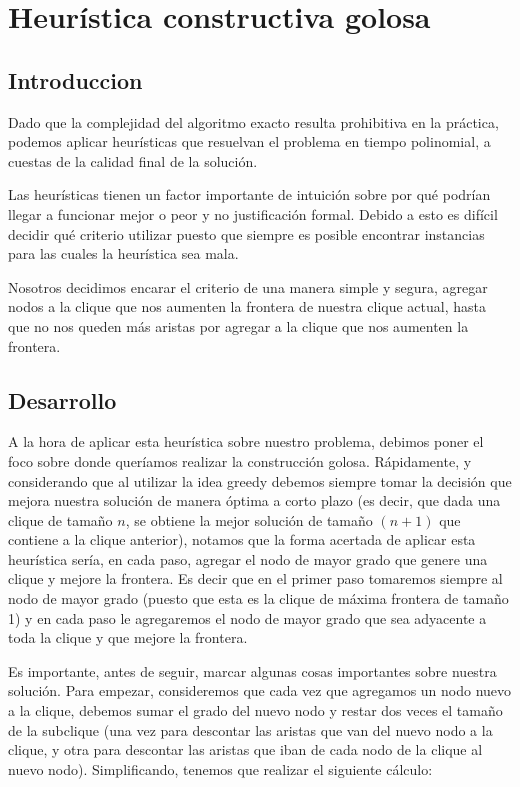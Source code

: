 \section{Heurística constructiva golosa}
\subsection{Introduccion}
Dado que la complejidad del algoritmo exacto resulta prohibitiva en la práctica, podemos aplicar heurísticas que resuelvan el problema en tiempo polinomial, a cuestas de la calidad final de la solución.

Las heurísticas tienen un factor importante de intuición sobre por qué podrían llegar a funcionar mejor o peor y no justificación formal. Debido a esto es difícil decidir qué criterio utilizar puesto que siempre es posible encontrar instancias para las cuales la heurística sea mala.

Nosotros decidimos encarar el criterio de una manera simple y segura, agregar nodos a la clique que nos aumenten la frontera de nuestra clique actual, hasta que no nos queden más aristas por agregar a la clique que nos aumenten la frontera.

\subsection{Desarrollo}
A la hora de aplicar esta heurística sobre nuestro problema, debimos poner el foco sobre donde queríamos realizar la construcción golosa. Rápidamente, y considerando que al utilizar la idea greedy debemos siempre tomar la decisión que mejora nuestra solución de manera óptima a corto plazo (es decir, que dada una clique de tamaño $n$, se obtiene la mejor solución de tamaño $(n+1)$ que contiene a la clique anterior), notamos que la forma acertada de aplicar esta heurística sería, en cada paso, agregar el nodo de mayor grado que genere una clique y mejore la frontera. Es decir que en el primer paso tomaremos siempre al nodo de mayor grado (puesto que esta es la clique de máxima frontera de tamaño 1) y en cada paso le agregaremos el nodo de mayor grado que sea adyacente a toda la clique y que mejore la frontera.

Es importante, antes de seguir, marcar algunas cosas importantes sobre nuestra solución. Para empezar, consideremos que cada vez que agregamos un nodo nuevo a la clique, debemos sumar el grado del nuevo nodo y restar dos veces el tamaño de la subclique (una vez para descontar las aristas que van del nuevo nodo a la clique, y otra para descontar las aristas que iban de cada nodo de la clique al nuevo nodo). Simplificando, tenemos que realizar el siguiente cálculo:


